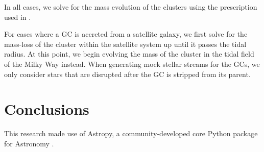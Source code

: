 \documentclass[letterpaper,12pt,preprint]{aastex}
\begin{document}
In all cases, we solve for the mass evolution of the clusters using the
prescription used in \citet{Gnedin:2014}.

For cases where a GC is accreted from a satellite galaxy, we first solve for
the mass-loss of the cluster within the satellite system up until it passes the
tidal radius.
At this point, we begin evolving the mass of the cluster in the tidal field of
the Milky Way instead.
When generating mock stellar streams for the GCs, we only consider stars that
are disrupted after the GC is stripped from its parent.

\section{Conclusions}\label{sec:conclusions}

\acknowledgements
This research made use of
Astropy, a community-developed core Python package for Astronomy
\citep{Astropy-Collaboration:2013}.



\end{document}
